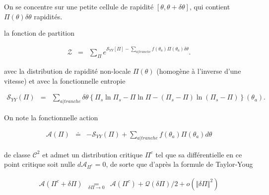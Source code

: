 On se concentre sur une petite cellule de rapidité $[\theta, \theta+\delta\theta]$, qui contient $\Pi(\theta) \delta \theta$ rapidités. 
	
	\begin{figure}[H]
		\centering 
		\captionsetup{skip=10pt} %
	\end{figure}


la fonction de partition 

\begin{eqnarray*}
	\mathcal{Z} & = & \sum_\Pi e^{\mathcal{S}_{YY}[\Pi]-\sum_{a\vert tranche} f(\theta_a)\Pi(\theta_a) \delta \theta }.
\end{eqnarray*}

avec la distribution de rapidité non-locale  $\Pi(\theta)$ (homogène à l'inverse d'une vitesse) et avec la fonctionnelle entropie 

\begin{eqnarray*}
	\mathcal{S}_{YY}(\Pi) & = & \sum_{a\vert tranche}  \delta \theta \left \{ \Pi_s \ln \Pi_s - \Pi \ln \Pi - ( \Pi_s - \Pi ) \ln (\Pi_s - \Pi) \right\}(\theta_a). 	
\end{eqnarray*}

On note la fonctionnelle action 

\begin{eqnarray*}
	\mathcal{A}(\Pi) & \doteq & -\mathcal{S}_{YY}(\Pi) + \sum_{a\vert tranche}  f(\theta_a)\Pi(\theta_a)d\theta	
\end{eqnarray*}

de classe $\mathcal{C}^2$ et admet un distribution critique $\Pi^c$ tel que sa différentielle en ce point critique soit nulle $d\mathcal{A}_{\Pi^c} =0$, de sorte que d'après la formule de Taylor-Youg 

\begin{eqnarray*}
	\mathcal{A}(\Pi^c +  \delta\Pi) & \underset{ \delta \Pi \to 0 }{=} & 	\mathcal{A}(\Pi^c ) + \mathcal{Q}(\delta\Pi)/2 + o(\Vert \delta \Pi \Vert^2) 	
\end{eqnarray*}

